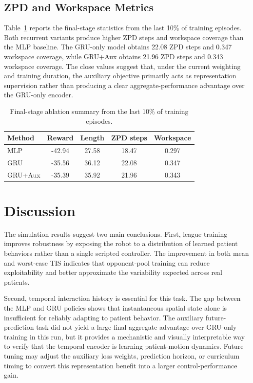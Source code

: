 \documentclass[lettersize,journal]{IEEEtran}
\begin{document}
\subsection{ZPD and Workspace Metrics}
Table~\ref{tab:ablation_summary} reports the final-stage statistics from the last 10\% of training episodes. Both recurrent variants produce higher ZPD steps and workspace coverage than the MLP baseline. The GRU-only model obtains 22.08 ZPD steps and 0.347 workspace coverage, while GRU+Aux obtains 21.96 ZPD steps and 0.343 workspace coverage. The close values suggest that, under the current weighting and training duration, the auxiliary objective primarily acts as representation supervision rather than producing a clear aggregate-performance advantage over the GRU-only encoder.

\begin{table}[!t]
\caption{Final-stage ablation summary from the last 10\% of training episodes.}
\label{tab:ablation_summary}
\centering
\begin{tabular}{lcccc}
\hline
Method & Reward & Length & ZPD steps & Workspace \\
\hline
MLP & -42.94 & 27.58 & 18.47 & 0.297 \\
GRU & -35.56 & 36.12 & 22.08 & 0.347 \\
GRU+Aux & -35.39 & 35.92 & 21.96 & 0.343 \\
\hline
\end{tabular}
\end{table}

\section{Discussion}
The simulation results suggest two main conclusions. First, league training improves robustness by exposing the robot to a distribution of learned patient behaviors rather than a single scripted controller. The improvement in both mean and worst-case TIS indicates that opponent-pool training can reduce exploitability and better approximate the variability expected across real patients.

Second, temporal interaction history is essential for this task. The gap between the MLP and GRU policies shows that instantaneous spatial state alone is insufficient for reliably adapting to patient behavior. The auxiliary future-prediction task did not yield a large final aggregate advantage over GRU-only training in this run, but it provides a mechanistic and visually interpretable way to verify that the temporal encoder is learning patient-motion dynamics. Future tuning may adjust the auxiliary loss weights, prediction horizon, or curriculum timing to convert this representation benefit into a larger control-performance gain.
\end{document}
